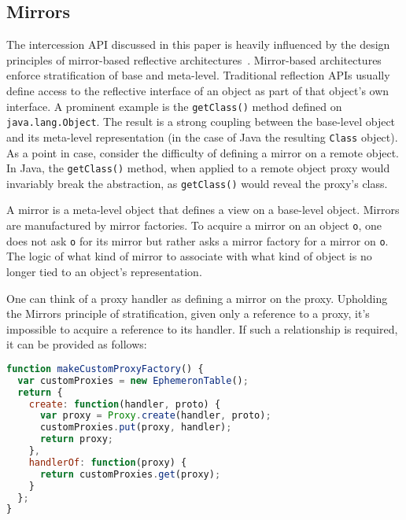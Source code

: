 \documentclass{acm_proc_article-sp}
\begin{document}

\subsection{Mirrors}

The intercession API discussed in this paper is heavily influenced by the design principles of mirror-based reflective architectures~\cite{bracha_04_mirrors_oopsla}. Mirror-based architectures enforce stratification of base and meta-level. Traditional reflection APIs usually define access to the reflective interface of an object as part of that object's own interface. A prominent example is the \texttt{getClass()} method defined on \texttt{java.lang.Object}. The result is a strong coupling between the base-level object and its meta-level representation (in the case of Java the resulting \texttt{Class} object). As a point in case, consider the difficulty of defining a mirror on a remote object. In Java, the \texttt{getClass()} method, when applied to a remote object proxy would invariably break the abstraction, as \texttt{getClass()} would reveal the proxy's class.

A mirror is a meta-level object that defines a view on a base-level object. Mirrors are manufactured by mirror factories. To acquire a mirror on an object \texttt{o}, one does not ask \texttt{o} for its mirror but rather asks a mirror factory for a mirror on \texttt{o}. The logic of what kind of mirror to associate with what kind of object is no longer tied to an object's representation.

One can think of a proxy handler as defining a mirror on the proxy. Upholding the Mirrors principle of stratification, given only a reference to a proxy, it's impossible to acquire a reference to its handler. If such a relationship is required, it can be provided as follows:

\begin{lstlisting}[language=javascript]
function makeCustomProxyFactory() {
  var customProxies = new EphemeronTable();
  return {
    create: function(handler, proto) {
      var proxy = Proxy.create(handler, proto);
      customProxies.put(proxy, handler);
      return proxy;
    },
    handlerOf: function(proxy) {
      return customProxies.get(proxy);
    }
  };
} 
\end{lstlisting}
\end{document}
